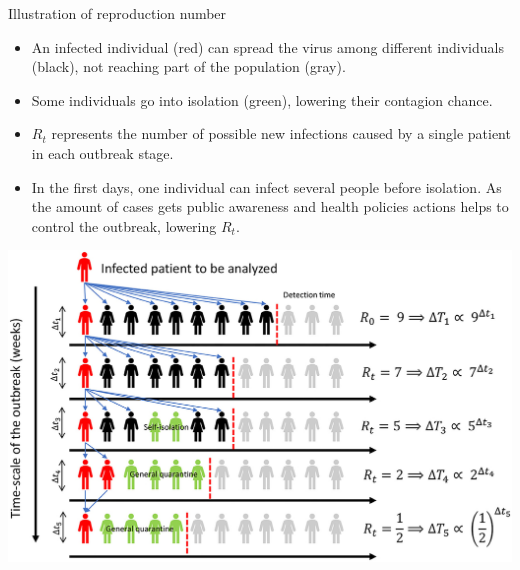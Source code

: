 \begin{frame}{Illustration of reproduction number}
\scriptsize
\begin{itemize}
    \item An infected individual (red) can spread the virus among different individuals (black), not reaching part of the population (gray).
    \item Some individuals go into isolation (green), lowering their contagion chance.
    \item  \(R_t\) represents the number of possible new infections caused by a single patient in each outbreak stage.
    \item In the first days, one individual can infect several people before isolation. As the amount of cases gets public awareness and health policies actions helps to control the outbreak, lowering \(R_t\).
\end{itemize}

\begin{center}
        \includegraphics[scale = 0.18]{lesson_3/images/reproductive_number.jpg}
\end{center}
\end{frame}

